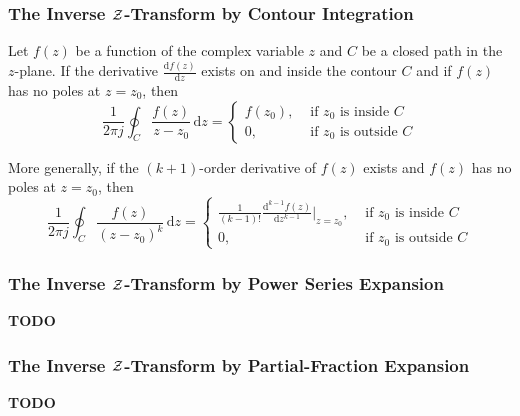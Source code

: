 \subsubsection{The Inverse \texorpdfstring{$\operatorname{\mathcal{Z}}$-Transform}{Z-Transform} by Contour Integration}\label{subsubsec:Inverse Z-Transform by Contour Integration}
\begin{definition}\label{def:Cauchy Integral Theorem}
  Let $f(z)$ be a function of the complex variable $z$ and $C$ be a closed path in the $z$-plane.
  If the derivative $\frac{\mathrm{d}f(z)}{\mathrm{d}z}$ exists on and inside the contour $C$ and if $f(z)$ has no poles at $z = z_{0}$, then
  \begin{equation}\label{eq:Cauchy Integral Theorem Specfic}
    \frac{1}{2 \pi j} \oint_{C} \frac{f(z)}{z-z_{0}} \, \mathrm{d}z = \begin{cases}
      f(z_{0}), & \text{ if $z_{0}$ is inside $C$} \\
      0, & \text{ if $z_{0}$ is outside $C$}
    \end{cases}
  \end{equation}

  More generally, if the $(k+1)$-order derivative of $f(z)$ exists and $f(z)$ has no poles at $z = z_{0}$, then
  \begin{equation}\label{eq:Cauchy Integral THeorem General}
    \frac{1}{2 \pi j} \oint_{C} \frac{f(z)}{\left( z-z_{0} \right)^{k}} \, \mathrm{d}z = \begin{cases}
      \frac{1}{\left( k-1 \right)!} \frac{\mathrm{d}^{k-1}f(z)}{\mathrm{d}z^{k-1}} \bigg \vert_{z=z_{0}}, & \text{ if $z_{0}$ is inside $C$} \\
      0, & \text{ if $z_{0}$ is outside $C$}
    \end{cases}
  \end{equation}
\end{definition}


\subsubsection{The Inverse \texorpdfstring{$\operatorname{\mathcal{Z}}$-Transform}{Z-Transform} by Power Series Expansion}\label{subsubsec:Inverse Z-Transform by Power Series Expansion}
\textbf{TODO}
\subsubsection{The Inverse \texorpdfstring{$\operatorname{\mathcal{Z}}$-Transform}{Z-Transform} by Partial-Fraction Expansion}\label{subsubsec:Inverse Z-Transform by Partial-Fraction Expansion}
\textbf{TODO}
